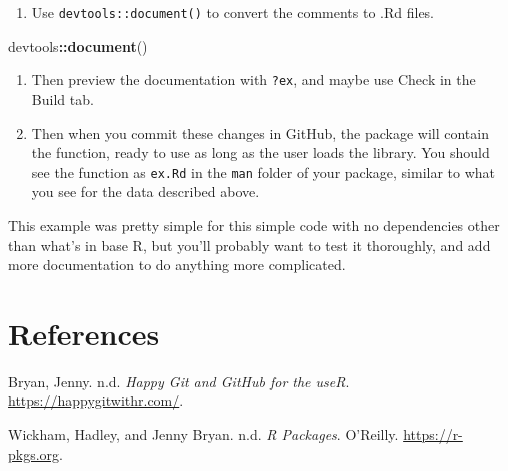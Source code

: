 \documentclass[
]{book}
\newenvironment{Shaded}{\begin{snugshade}}{\end{snugshade}}
\newcommand{\FunctionTok}[1]{\textcolor[rgb]{0.27,0.27,0.27}{\textbf{#1}}}
\newcommand{\NormalTok}[1]{#1}
\newcommand{\SpecialCharTok}[1]{\textcolor[rgb]{0.43,0.43,0.43}{\textbf{#1}}}
\providecommand{\tightlist}{%
  \setlength{\itemsep}{0pt}\setlength{\parskip}{0pt}}
\newlength{\cslhangindent}
\newlength{\cslentryspacingunit} %
\newenvironment{CSLReferences}[2] %
 {%
  \setlength{\parindent}{0pt}
  \ifodd #1
  \let\oldpar\par
  \def\par{\hangindent=\cslhangindent\oldpar}
  \fi
  \setlength{\parskip}{#2\cslentryspacingunit}
 }%
 {}
\begin{document}
\begin{enumerate}
\def\labelenumi{\arabic{enumi}.}
\setcounter{enumi}{4}
\tightlist
\item
  Use \texttt{devtools::document()} to convert the comments to .Rd files.
\end{enumerate}

\begin{Shaded}
\begin{Highlighting}[]
\NormalTok{devtools}\SpecialCharTok{::}\FunctionTok{document}\NormalTok{()}
\end{Highlighting}
\end{Shaded}

\begin{enumerate}
\def\labelenumi{\arabic{enumi}.}
\setcounter{enumi}{5}
\item
  Then preview the documentation with \texttt{?ex}, and maybe use Check in the Build tab.
\item
  Then when you commit these changes in GitHub, the package will contain the function, ready to use as long as the user loads the library. You should see the function as \texttt{ex.Rd} in the \texttt{man} folder of your package, similar to what you see for the data described above.
\end{enumerate}

This example was pretty simple for this simple code with no dependencies other than what's in base R, but you'll probably want to test it thoroughly, and add more documentation to do anything more complicated.

\hypertarget{references}{%
\chapter*{References}\label{references}}


\hypertarget{refs}{}
\begin{CSLReferences}{1}{0}
\leavevmode{}%
Bryan, Jenny. n.d. \emph{Happy Git and GitHub for the useR}. \url{https://happygitwithr.com/}.

\leavevmode{}%
Wickham, Hadley, and Jenny Bryan. n.d. \emph{R Packages}. O'Reilly. \url{https://r-pkgs.org}.

\end{CSLReferences}

\backmatter
\printindex
\end{document}
